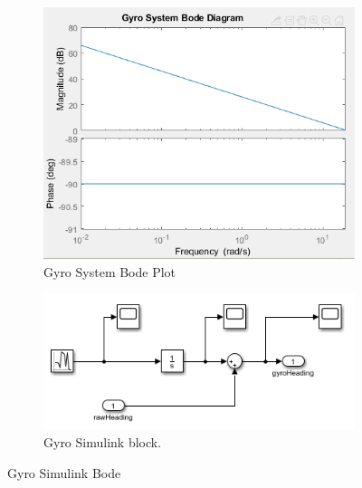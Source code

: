 \begin{figure}[H]
\begin{subfigure}{.4\linewidth}
  \centering
  \includegraphics[width=\linewidth]{img/gyro_system_bode.PNG}  
  \caption{Gyro System Bode Plot}
  \label{fig:gyro_bode}
\end{subfigure}
\begin{subfigure}{.6\linewidth}
  \centering
  \includegraphics[width=\linewidth]{img/gyro_simulink_block.PNG}  
  \caption{Gyro Simulink block.}
  \label{fig:gyro_simulink_block}
\end{subfigure}
\caption{Gyro Simulink Bode}
\label{fig:fig}
\end{figure}



